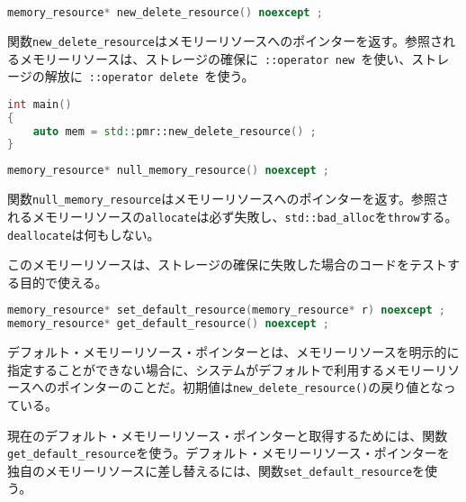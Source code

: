 \bgroup
\begin{lstlisting}[language=C++]
memory_resource* new_delete_resource() noexcept ;
\end{lstlisting}
\egroup

関数\lstinline!new_delete_resource!はメモリーリソースへのポインターを返す。参照されるメモリーリソースは、ストレージの確保に~\lstinline!::operator new!~を使い、ストレージの解放に~\lstinline!::operator delete!~を使う。

\begin{lstlisting}[language=C++]
int main()
{
    auto mem = std::pmr::new_delete_resource() ;
}
\end{lstlisting}

%

\bgroup
\begin{lstlisting}[language=C++]
memory_resource* null_memory_resource() noexcept ;
\end{lstlisting}
\egroup

関数\lstinline!null_memory_resource!はメモリーリソースへのポインターを返す。参照されるメモリーリソースの\lstinline!allocate!は必ず失敗し、\lstinline!std::bad_alloc!を\lstinline!throw!する。\lstinline!deallocate!は何もしない。

このメモリーリソースは、ストレージの確保に失敗した場合のコードをテストする目的で使える。

%

\bgroup
\begin{lstlisting}[language=C++]
memory_resource* set_default_resource(memory_resource* r) noexcept ;
memory_resource* get_default_resource() noexcept ;
\end{lstlisting}
\egroup

デフォルト・メモリーリソース・ポインターとは、メモリーリソースを明示的に指定することができない場合に、システムがデフォルトで利用するメモリーリソースへのポインターのことだ。初期値は\lstinline!new_delete_resource()!の戻り値となっている。

現在のデフォルト・メモリーリソース・ポインターと取得するためには、関数\lstinline!get_default_resource!を使う。デフォルト・メモリーリソース・ポインターを独自のメモリーリソースに差し替えるには、関数\lstinline!set_default_resource!を使う。

